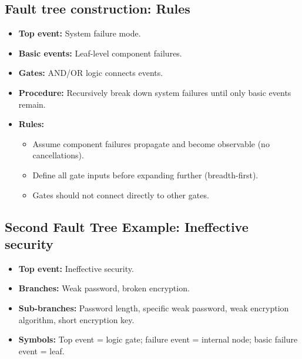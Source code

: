 \documentclass[11pt,a4paper]{article}
\begin{document}
\subsection*{Fault tree construction: Rules}
\begin{itemize}
    \item \textbf{Top event:} System failure mode.
    \item \textbf{Basic events:} Leaf-level component failures.
    \item \textbf{Gates:} AND/OR logic connects events.
    \item \textbf{Procedure:} Recursively break down system failures until only basic events remain.
    \item \textbf{Rules:} 
        \begin{itemize}
            \item Assume component failures propagate and become observable (no cancellations).
            \item Define all gate inputs before expanding further (breadth-first).
            \item Gates should not connect directly to other gates.
        \end{itemize}
\end{itemize}

\subsection*{Second Fault Tree Example: Ineffective security}
\begin{itemize}
    \item \textbf{Top event:} Ineffective security.
    \item \textbf{Branches:} Weak password, broken encryption.
    \item \textbf{Sub-branches:} Password length, specific weak password, weak encryption algorithm, short encryption key.
    \item \textbf{Symbols:} Top event = logic gate; failure event = internal node; basic failure event = leaf.
\end{itemize}
\end{document}
